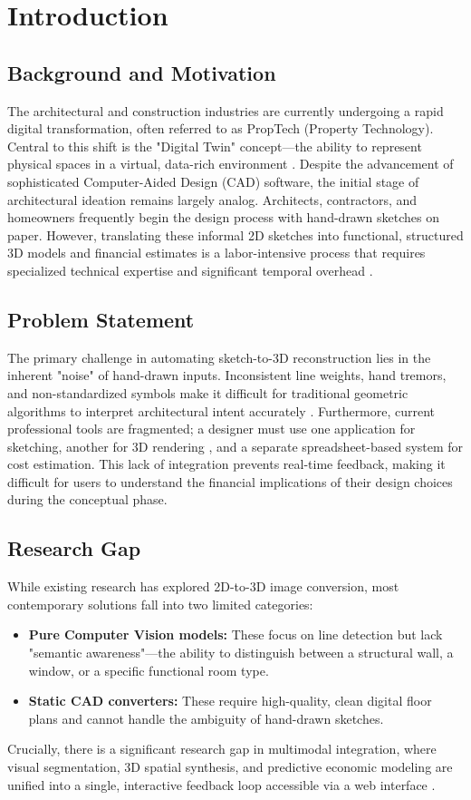 \documentclass[10pt, conference, a4paper]{IEEEtran}
\begin{document}
\section{Introduction}

\subsection{Background and Motivation}
The architectural and construction industries are currently undergoing a rapid digital transformation, often referred to as PropTech (Property Technology). Central to this shift is the "Digital Twin" concept—the ability to represent physical spaces in a virtual, data-rich environment \cite{5}. Despite the advancement of sophisticated Computer-Aided Design (CAD) software, the initial stage of architectural ideation remains largely analog. Architects, contractors, and homeowners frequently begin the design process with hand-drawn sketches on paper. However, translating these informal 2D sketches into functional, structured 3D models and financial estimates is a labor-intensive process that requires specialized technical expertise and significant temporal overhead \cite{6}.

\subsection{Problem Statement}
The primary challenge in automating sketch-to-3D reconstruction \cite{4} lies in the inherent "noise" of hand-drawn inputs. Inconsistent line weights, hand tremors, and non-standardized symbols make it difficult for traditional geometric algorithms to interpret architectural intent accurately \cite{7}. Furthermore, current professional tools are fragmented; a designer must use one application for sketching, another for 3D rendering \cite{14}, and a separate spreadsheet-based system for cost estimation. This lack of integration prevents real-time feedback, making it difficult for users to understand the financial implications of their design choices during the conceptual phase.

\subsection{Research Gap}
While existing research has explored 2D-to-3D image conversion, most contemporary solutions fall into two limited categories:
\begin{itemize}
    \item \textbf{Pure Computer Vision models:} These focus on line detection but lack "semantic awareness"—the ability to distinguish between a structural wall, a window, or a specific functional room type.
    \item \textbf{Static CAD converters:} These require high-quality, clean digital floor plans and cannot handle the ambiguity of hand-drawn sketches.
\end{itemize}
Crucially, there is a significant research gap in multimodal integration, where visual segmentation, 3D spatial synthesis, and predictive economic modeling are unified into a single, interactive feedback loop accessible via a web interface \cite{4, 5}.
\end{document}
